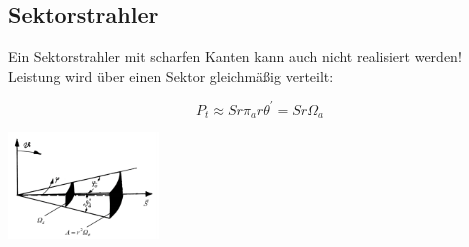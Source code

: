 \documentclass[english]{latex4ei/latex4ei_sheet}
\begin{document}
\begin{sectionbox}
    \subsection{Sektorstrahler}
    Ein Sektorstrahler mit scharfen Kanten kann auch nicht realisiert werden!
    Leistung wird über einen Sektor gleichmäßig verteilt:

    $$P_t \approx S r \pi_{a} r \theta^{'} = S r \Omega_{a}$$

    \begin{center}\includegraphics[width = 4cm]{./img/antennen_sektor_strahler.png}
    \end{center}
\end{sectionbox}
\end{document}
